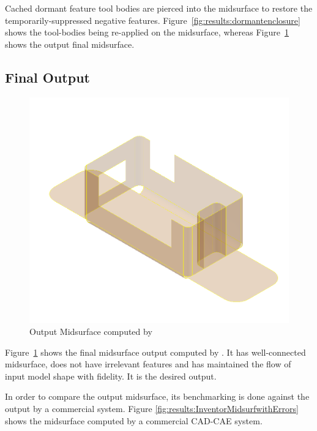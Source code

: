 

Cached dormant feature tool bodies are pierced into the midsurface to restore the temporarily-suppressed  negative features. Figure~\ref{fig:results:dormantenclosure} shows the tool-bodies being re-applied on the midsurface, whereas Figure~\ref{fig:results:outputmidsurfenclosure} shows the output final midsurface.



\subsection{Final Output}


\begin{figure}[!h]
\centering     %
\includegraphics[width=0.62\linewidth,valign=t]{../Common/images/SheetMetal_Medium_Enclosure_final_midsurf_part}
\caption{Output Midsurface computed by \mysystemname}
\label{fig:results:outputmidsurfenclosure}
\end{figure}


Figure~\ref{fig:results:outputmidsurfenclosure} shows the final midsurface output computed by \mysystemname.  It has well-connected midsurface, does not have irrelevant features and has maintained the flow of input model shape with fidelity. It is the desired output.

%
%

In order to compare the output midsurface, its benchmarking is done against the output by a commercial system. Figure \ref{fig:results:InventorMidsurfwithErrors} shows the midsurface computed by a commercial CAD-CAE system.

